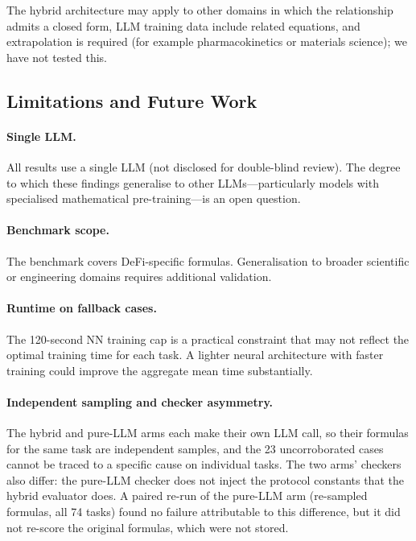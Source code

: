 \documentclass[twoside,11pt]{article}
\begin{document}
The hybrid architecture may apply to other domains in which the relationship admits a closed form, LLM training data include related equations, and extrapolation is required (for example pharmacokinetics or materials science); we have not tested this.

\subsection{Limitations and Future Work}\label{subsec:limitations-and-future-work}
\label{sec:limitations}

\paragraph{Single LLM.}
All results use a single LLM (not disclosed for double-blind review).
The degree to which these findings generalise to other LLMs---particularly
models with specialised mathematical pre-training---is an open question.

\paragraph{Benchmark scope.}
The benchmark covers DeFi-specific formulas.  Generalisation to broader scientific
or engineering domains requires additional validation.

\paragraph{Runtime on fallback cases.}
The 120-second NN training cap is a practical constraint that may not reflect the
optimal training time for each task.  A lighter neural architecture with faster
training could improve the aggregate mean time substantially.

\paragraph{Independent sampling and checker asymmetry.}
The hybrid and pure-LLM arms each make their own LLM call, so their formulas
for the same task are independent samples, and the 23 uncorroborated cases
cannot be traced to a specific cause on individual tasks. The two arms' checkers also differ:
the pure-LLM checker does not inject the protocol constants that the hybrid
evaluator does. A paired re-run of the pure-LLM arm (re-sampled formulas, all
74 tasks) found no failure attributable to this difference, but it did not
re-score the original formulas, which were not stored.
\end{document}

